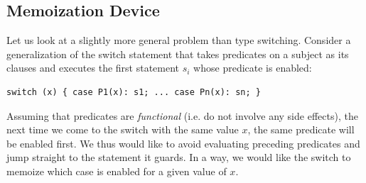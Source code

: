 %

\subsection{Memoization Device}
\label{sec:memdev}

Let us look at a slightly more general problem than type switching. Consider a 
generalization of the switch statement that takes predicates on a subject as its 
clauses and executes the first statement $s_i$ whose predicate is enabled: 

\begin{lstlisting}[keepspaces]
switch (x) { case P1(x): s1; ... case Pn(x): sn; }
\end{lstlisting}

\noindent
Assuming that predicates are \emph{functional} (i.e. do not involve any side 
effects), the next time we come to the switch with the same value $x$, the same 
predicate will be enabled first. We thus would like to avoid evaluating 
preceding predicates and jump straight to the statement it guards. In a way, we 
would like the switch to memoize which case is enabled for a given value of $x$. 

